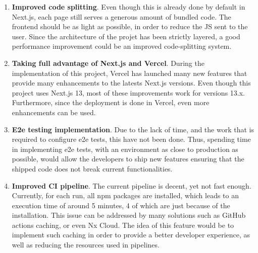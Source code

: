 \documentclass[../memory.tex]{subfiles}
\begin{document}
\begin{enumerate}
	\item\textbf{Improved code splitting}. Even though this is already done by
	default in Next.js, each page still serves a generous amount of bundled
	code. The frontend should be as light as possible, in order to reduce the JS
	sent to the user. Since the architecture of the projet has been strictly
	layered, a good performance improvement could be an improved code-splitting
	system.
	\item\textbf{Taking full advantage of Next.js and Vercel}. During the
	implementation of this project, Vercel has launched many new features that
	provide many enhancements to the latests Next.js versions. Even though this
	project uses Next.js 13, most of these improvements work for versions 13.x.
	Furthermore, since the deployment is done in Vercel, even more enhancements
	can be used.
	\item\textbf{E2e testing implementation}. Due to the lack of time, and the
	work that is required to configure e2e tests, this have not been done.
	Thus, spending time in implementing e2e tests, with an environment as close
	to production as possible, would allow the developers to ship new features
	ensuring that the shipped code does not break current functionalities.
	\item\textbf{Improved CI pipeline}. The current pipeline is decent, yet
	not fast enough. Currently, for each run, all npm packages are installed,
	which leads to an execution time of around 5 minutes, 4 of which are just
	because of the installation. This issue can be addressed by many solutions
	such as GitHub actions caching, or even Nx Cloud. The idea of this feature
	would be to implement such caching in order to provide a better developer
	experience, as well as reducing the resources used in pipelines.
\end{enumerate}
\end{document}
